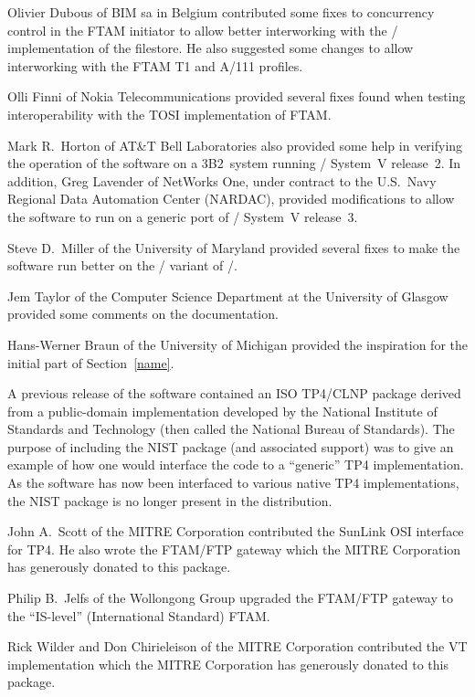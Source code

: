 Olivier Dubous
of BIM sa in Belgium contributed some fixes to concurrency control in the FTAM
initiator to allow better interworking with the \vms/ implementation of the
filestore.
He also suggested some changes to allow interworking with the FTAM T1 and
A/111 profiles.

Olli Finni
of Nokia Telecommunications
provided several fixes found when testing interoperability with the TOSI
implementation of FTAM.

Mark R.~Horton
of AT\&T Bell Laboratories
also provided some help in verifying the operation of the
software on a 3B2~system running \unix/ System~V release~2.
In addition,
Greg Lavender of NetWorks One,
under contract to the U.S.~Navy Regional Data Automation Center (NARDAC),
provided modifications to allow the software to run on a generic port of
\unix/ System~V release~3.

Steve D.~Miller
of the University of Maryland
provided several fixes to make the software run better on the \ultrix/ variant
of \unix/.

Jem Taylor
of the Computer Science Department at the University of Glasgow
provided some comments on the documentation.

Hans-Werner Braun
of the University of Michigan provided the inspiration for the initial part of
Section~\ref{name}.

A previous release of the software contained an ISO TP4/CLNP package
derived from a public-domain implementation developed by the National
Institute of Standards and Technology
(then called the National Bureau of Standards).
The purpose of including the NIST package (and associated support)
was to give an example of how one would interface the code to a ``generic'' TP4
implementation.
As the software has now been interfaced to various native TP4 implementations,
the NIST package is no longer present in the distribution.

John A.~Scott
of the MITRE Corporation contributed the SunLink OSI interface for TP4.
He also wrote the FTAM/FTP gateway which the MITRE Corporation has generously
donated to this package. 

Philip B.~Jelfs
of the Wollongong Group upgraded the FTAM/FTP gateway to the
``IS-level'' (International Standard) FTAM.

Rick Wilder
and
Don Chirieleison
of the MITRE Corporation contributed the VT implementation which the MITRE
Corporation has generously donated to this package.

